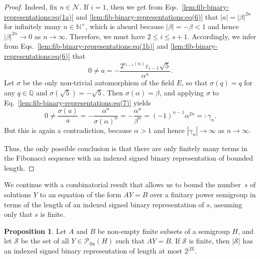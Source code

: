 \documentclass[11pt,reqno]{amsart}
\theoremstyle{definition}
\newtheorem{proposition}[theorem]{Proposition}
\theoremstyle{remark}
\theoremstyle{theoremdd}
\newcommand{\fin}{\mathrm{fin}}
\renewcommand{\,}{\kern 0.1em}
\begin{document}
\begin{proof}
Indeed, fix $n \in \mathcal N$. If $i = 1$, then we get from Eqs.~\eqref{lem:fib-binary-representations:eq(1a)} and \eqref{lem:fib-binary-representations:eq(6)} that $|a| = |\beta|^{2n}$ for infinitely many $n \in \mathbb N^+$, which is absurd because $|\beta| = -\beta < 1$ and hence $|\beta|^{2n} \to 0$ as $n \to \infty$. Therefore, we must have $2 \le i \le s+1$. Accordingly, we infer from Eqs.~\eqref{lem:fib-binary-representations:eq(1b)} and \eqref{lem:fib-binary-representations:eq(6)} that 
%
\begin{equation}
\label{lem:fib-binary-representations:eq(7)}
0 \ne a = -\frac{2^{e_{i - 1}(n)} \varepsilon_{i-1} \sqrt{5}}{\alpha^n}.
\end{equation}
Let
$\sigma$ be the only non-trivial automorphism of the field $E$, so that $\sigma(q) = q$ for any $q \in \mathbb Q$ and $\sigma(\sqrt{5}) = -\sqrt{5}$. Then $\sigma(\alpha) = \beta$, and applying $\sigma$ to Eq.~\eqref{lem:fib-binary-representations:eq(7)} yields
\[
0 \ne \frac{\sigma(a)}{a} = - \frac{\alpha^n}{\sigma(\alpha)^n} = -\frac{\alpha^n}{\beta^n} = (-1)^{n-1} \alpha^{2n} =: \gamma_n.
\]
But this is again a contradiction, because $\alpha > 1$ and hence $|\gamma_n| \to \infty$ as $n \to \infty$.

Thus, the only possible conclusion is that there are only finitely many terms in the Fibonacci sequence with an indexed signed binary representation of bounded length.
\end{proof}


We continue with a combinatorial result that allows us to bound the number~$s$ 
of solutions $Y$ to an equation of the form $AY = B$ over a finitary 
power semigroup in terms of the length of an indexed signed binary 
representation of $s$, assuming only that $s$ is finite.

\begin{proposition}
\label{prop:fiber-counting}
Let $A$ and $B$ be non-empty finite subsets of a semigroup $H$, and let
$\mathcal S$ be the set of all $Y \in \mathcal P_{\fin}(H)$ such that
$AY=B$. If $\mathcal S$ is finite, then $|\mathcal S|$ has an indexed
signed binary representation of length at most $2^{|B|}$.
\end{proposition}
\end{document}
